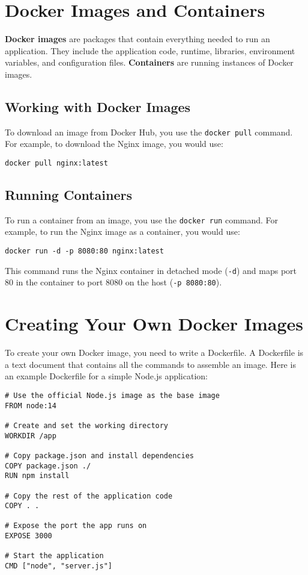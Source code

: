 \documentclass[12pt]{article}
\begin{document}
\section{Docker Images and Containers}
\textbf{Docker images} are packages that contain everything needed to run an application. They include the application code, runtime, libraries, environment variables, and configuration files. \textbf{Containers} are running instances of Docker images.

\subsection{Working with Docker Images}
To download an image from Docker Hub, you use the \texttt{docker pull} command. For example, to download the Nginx image, you would use:
\begin{lstlisting}
docker pull nginx:latest
\end{lstlisting}

\subsection{Running Containers}
To run a container from an image, you use the \texttt{docker run} command. For example, to run the Nginx image as a container, you would use:
\begin{lstlisting}
docker run -d -p 8080:80 nginx:latest
\end{lstlisting}
This command runs the Nginx container in detached mode (\texttt{-d}) and maps port 80 in the container to port 8080 on the host (\texttt{-p 8080:80}).

\section{Creating Your Own Docker Images}
To create your own Docker image, you need to write a Dockerfile. A Dockerfile is a text document that contains all the commands to assemble an image. Here is an example Dockerfile for a simple Node.js application:
\begin{lstlisting}
# Use the official Node.js image as the base image
FROM node:14

# Create and set the working directory
WORKDIR /app

# Copy package.json and install dependencies
COPY package.json ./
RUN npm install

# Copy the rest of the application code
COPY . .

# Expose the port the app runs on
EXPOSE 3000

# Start the application
CMD ["node", "server.js"]
\end{lstlisting}
\end{document}
